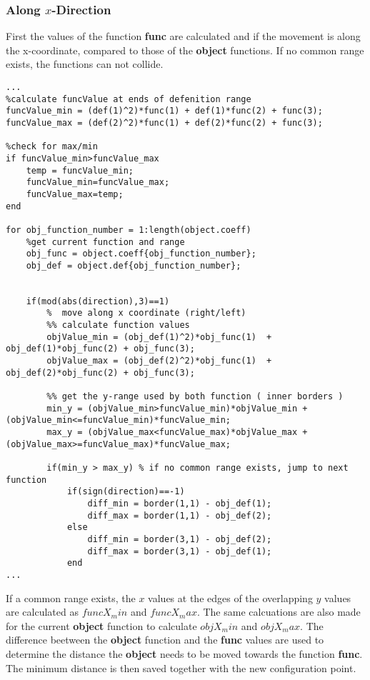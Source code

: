 \subsubsection{Along $x$-Direction}
First the values of the function \textbf{func} are calculated and if the movement is along the x-coordinate, compared to those of the \textbf{object} functions. If no common range exists, the functions can not collide.
\begin{lstlisting}
...
%calculate funcValue at ends of defenition range
funcValue_min = (def(1)^2)*func(1) + def(1)*func(2) + func(3);
funcValue_max = (def(2)^2)*func(1) + def(2)*func(2) + func(3);

%check for max/min
if funcValue_min>funcValue_max
    temp = funcValue_min;
    funcValue_min=funcValue_max;
    funcValue_max=temp;
end

for obj_function_number = 1:length(object.coeff)
    %get current function and range
    obj_func = object.coeff{obj_function_number};
    obj_def = object.def{obj_function_number};
    
 
    if(mod(abs(direction),3)==1)
        %  move along x coordinate (right/left)
        %% calculate function values
        objValue_min = (obj_def(1)^2)*obj_func(1)  + obj_def(1)*obj_func(2) + obj_func(3);
        objValue_max = (obj_def(2)^2)*obj_func(1)  + obj_def(2)*obj_func(2) + obj_func(3);
        
        %% get the y-range used by both function ( inner borders )
        min_y = (objValue_min>funcValue_min)*objValue_min + (objValue_min<=funcValue_min)*funcValue_min;
        max_y = (objValue_max<funcValue_max)*objValue_max + (objValue_max>=funcValue_max)*funcValue_max;
        
        if(min_y > max_y) % if no common range exists, jump to next function
            if(sign(direction)==-1)
                diff_min = border(1,1) - obj_def(1);
                diff_max = border(1,1) - obj_def(2);
            else
                diff_min = border(3,1) - obj_def(2);
                diff_max = border(3,1) - obj_def(1);
            end
...
\end{lstlisting}
 If a common range exists, the $x$ values at the edges of the overlapping $y$ values are calculated as $funcX_min$ and $funcX_max$.
The same calcuations are also made for the current \textbf{object} function to calculate $objX_min$ and $objX_max$. The difference beetween the \textbf{object} function and the \textbf{func} values are used to determine the distance the \textbf{object} needs to be moved towards the function \textbf{func}. The minimum distance is then saved together with the new configuration point.
